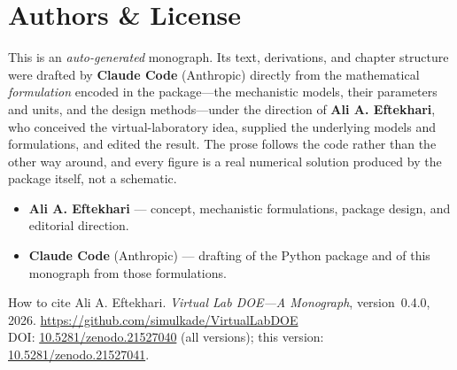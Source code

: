 \chapter*{Authors \& License}

This is an \emph{auto-generated} monograph. Its text, derivations, and chapter
structure were drafted by \textbf{Claude Code} (Anthropic) directly from the
mathematical \emph{formulation} encoded in the  package---the
mechanistic models, their parameters and units, and the design methods---under the
direction of \textbf{Ali A. Eftekhari}, who conceived the virtual-laboratory idea,
supplied the underlying models and formulations, and edited the result. The prose
follows the code rather than the other way around, and every figure is a real
numerical solution produced by the package itself, not a schematic.

\begin{itemize}
  \item \textbf{Ali A. Eftekhari} --- concept, mechanistic formulations, package
  design, and editorial direction.
  \item \textbf{Claude Code} (Anthropic) --- drafting of the 
  Python package and of this monograph from those formulations.
\end{itemize}

\begin{keybox}{How to cite}
\noindent Ali A. Eftekhari. \emph{Virtual Lab DOE---A Monograph}, version~0.4.0,
2026. \url{https://github.com/simulkade/VirtualLabDOE}\\[0.3em]
DOI: \href{https://doi.org/10.5281/zenodo.21527040}{10.5281/zenodo.21527040}
(all versions); this version:
\href{https://doi.org/10.5281/zenodo.21527041}{10.5281/zenodo.21527041}.
\end{keybox}

